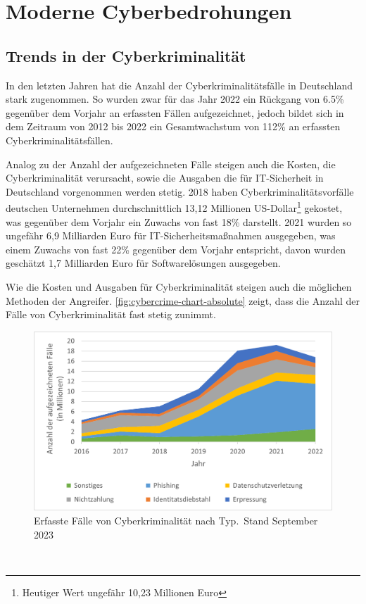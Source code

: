 \newpage


\section{Moderne Cyberbedrohungen}\label{sec:moderne-cyberbedrohungen}

\subsection{Trends in der Cyberkriminalität}\label{subsec:trends-und-entwicklungen-in-der-cyberkriminalitat}
In den letzten Jahren hat die Anzahl der Cyberkriminalitätsfälle in Deutschland stark zugenommen.
So wurden zwar für das Jahr 2022 ein Rückgang von 6.5\% gegenüber dem Vorjahr an erfassten Fällen aufgezeichnet, jedoch bildet sich in dem Zeitraum von 2012 bis 2022 ein Gesamtwachstum von 112\% an erfassten Cyberkriminalitätsfällen\autocite[\vglf][]{bka-cyberkriminalitaet}.

Analog zu der Anzahl der aufgezeichneten Fälle steigen auch die Kosten, die Cyberkriminalität verursacht, sowie die Ausgaben die für IT-Sicherheit in Deutschland vorgenommen werden stetig.
2018 haben Cyberkriminalitätsvorfälle deutschen Unternehmen durchschnittlich 13,12 Millionen US-Dollar\footnote{Heutiger Wert ungefähr 10,23 Millionen Euro} gekostet, was gegenüber dem Vorjahr ein Zuwachs von fast 18\% darstellt\autocite[\vglf][]{accenture-cyberkrime-kosten}.
2021 wurden so ungefähr 6,9 Milliarden Euro für IT-Sicherheitsmaßnahmen ausgegeben, was einem Zuwachs von fast 22\% gegenüber dem Vorjahr entspricht\autocite[\vglf][]{bitkom-itsicherheit}, davon wurden geschätzt 1,7 Milliarden Euro für Softwarelösungen ausgegeben\autocite[\vglf][]{bitkom-itsicherheit-segment}.

Wie die Kosten und Ausgaben für Cyberkriminalität steigen auch die möglichen Methoden der Angreifer.
\autoref{fig:cybercrime-chart-absolute} zeigt, dass die Anzahl der Fälle von Cyberkriminalität fast stetig zunimmt.

\begin{figure}[htpb]
    \centering
    \includegraphics[width = 0.65\linewidth]{src/abbildungen/Aufgezeichnete_Cyberkriminalitaet}
    \captionsetup{width=\linewidth, format=hang}
    \caption[Erfasste Fälle von Cyberkriminalität nach Typ]{Erfasste Fälle von Cyberkriminalität nach Typ.\footnotemark{}\ Stand September 2023}
    \label{fig:cybercrime-chart-absolute}
\end{figure}\ 

